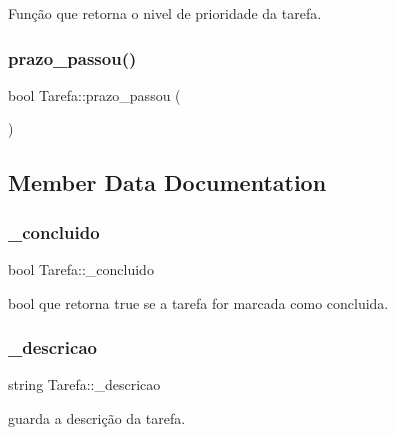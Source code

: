 Função que retorna o nivel de prioridade da tarefa. 

\mbox{\label{classTarefa_a604bd50ddc5ad8c919b432282d141ee0}} 
\subsubsection{\texorpdfstring{prazo\+\_\+passou()}{prazo\_passou()}}
{\footnotesize\ttfamily bool Tarefa\+::prazo\+\_\+passou (\begin{DoxyParamCaption}{ }\end{DoxyParamCaption})}



\subsection{Member Data Documentation}
\mbox{\label{classTarefa_a02764495d093d388ec2fb21c0bde3603}} 
\subsubsection{\texorpdfstring{\+\_\+concluido}{\_concluido}}
{\footnotesize\ttfamily bool Tarefa\+::\+\_\+concluido\hspace{0.3cm}{\ttfamily [private]}}



bool que retorna true se a tarefa for marcada como concluida. 

\mbox{\label{classTarefa_acc9dffa5eb12b46370e67b32b96863f2}} 
\subsubsection{\texorpdfstring{\+\_\+descricao}{\_descricao}}
{\footnotesize\ttfamily string Tarefa\+::\+\_\+descricao\hspace{0.3cm}{\ttfamily [private]}}



guarda a descrição da tarefa. 

\mbox{\label{classTarefa_a54326411de197afb5a6f8d98d109e840}} 
